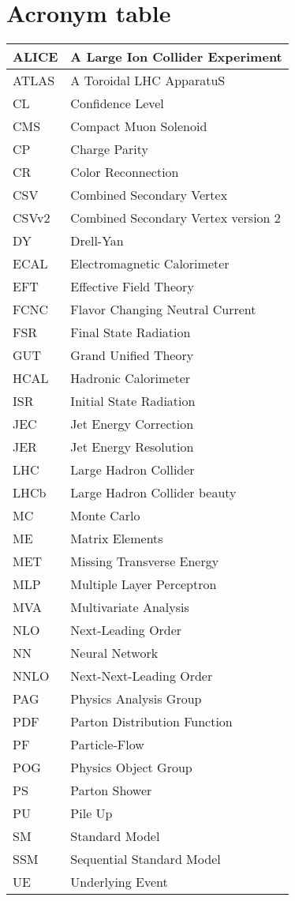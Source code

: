 \chapter*{Acronym table}\label{chap:acronym}
\begin{table}[!htb]
\begin{tabular}{|l|l|}
\hline
ALICE& A Large Ion Collider Experiment \\ \hline
ATLAS& A Toroidal LHC ApparatuS \\ \hline
CL& Confidence Level \\ \hline
CMS& Compact Muon Solenoid \\ \hline
CP& Charge Parity \\ \hline
CR& Color Reconnection \\ \hline
CSV& Combined Secondary Vertex \\ \hline
CSVv2& Combined Secondary Vertex version 2 \\ \hline
DY& Drell-Yan \\ \hline
ECAL& Electromagnetic Calorimeter \\ \hline
EFT& Effective Field Theory \\ \hline
FCNC& Flavor Changing Neutral Current \\ \hline
FSR& Final State Radiation \\ \hline
GUT& Grand Unified Theory \\ \hline
HCAL& Hadronic Calorimeter \\ \hline
ISR& Initial State Radiation \\ \hline
JEC& Jet Energy Correction \\ \hline
JER& Jet Energy Resolution \\ \hline
LHC& Large Hadron Collider \\ \hline
LHCb& Large Hadron Collider beauty \\ \hline
MC& Monte Carlo \\ \hline
ME& Matrix Elements \\ \hline
MET& Missing Transverse Energy \\ \hline
MLP& Multiple Layer Perceptron \\ \hline
MVA& Multivariate Analysis \\ \hline
NLO& Next-Leading Order \\ \hline
NN& Neural Network \\ \hline
NNLO& Next-Next-Leading Order \\ \hline
PAG& Physics Analysis Group \\ \hline
PDF& Parton Distribution Function \\ \hline
PF& Particle-Flow \\ \hline
POG& Physics Object Group \\ \hline
PS& Parton Shower \\ \hline
PU& Pile Up \\ \hline
SM& Standard Model \\ \hline
SSM& Sequential Standard Model \\ \hline
UE& Underlying Event \\ \hline
\end{tabular}
\end{table}

